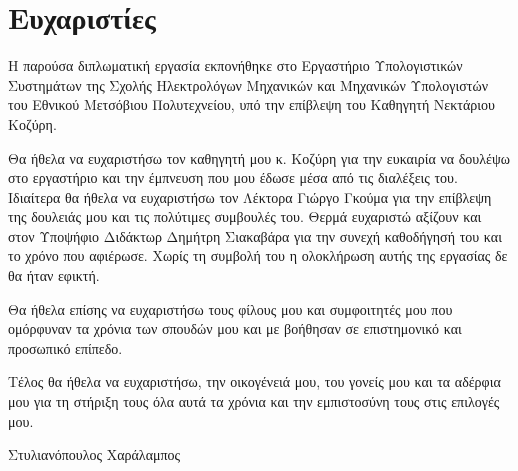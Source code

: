 
\section*{Ευχαριστίες}

H παρούσα διπλωματική εργασία εκπονήθηκε στο Εργαστήριο Υπολογιστικών Συστημάτων της Σχολής Ηλεκτρολόγων Μηχανικών και Μηχανικών Υπολογιστών του Εθνικού Μετσόβιου Πολυτεχνείου, υπό την επίβλεψη του Καθηγητή Νεκτάριου Κοζύρη.

Θα ήθελα να ευχαριστήσω τον καθηγητή μου κ. Κοζύρη για την ευκαιρία να δουλέψω στο εργαστήριο και την έμπνευση που μου έδωσε μέσα από τις διαλέξεις του. Ιδιαίτερα θα ήθελα να ευχαριστήσω τον Λέκτορα Γιώργο Γκούμα για την επίβλεψη της δουλειάς μου και τις πολύτιμες συμβουλές του. Θερμά ευχαριστώ αξίζουν και στον Υποψήφιο Διδάκτωρ Δημήτρη Σιακαβάρα για την συνεχή καθοδήγησή του και το χρόνο που αφιέρωσε. Χωρίς τη συμβολή του η ολοκλήρωση αυτής της εργασίας δε θα ήταν εφικτή.

Θα ήθελα επίσης να ευχαριστήσω τους φίλους μου και συμφοιτητές μου που ομόρφυναν τα χρόνια των σπουδών μου και με βοήθησαν σε επιστημονικό και προσωπικό επίπεδο.

Τέλος θα ήθελα να ευχαριστήσω, την οικογένειά μου, του γονείς μου και τα αδέρφια μου για τη στήριξη τους όλα αυτά τα χρόνια και την εμπιστοσύνη τους στις επιλογές μου.

{\raggedleft Στυλιανόπουλος Χαράλαμπος}
